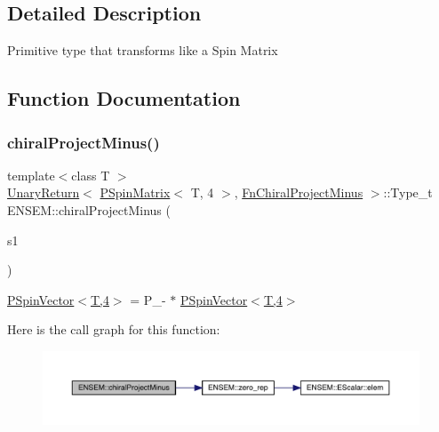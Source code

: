 \subsection{Detailed Description}
Primitive type that transforms like a Spin Matrix 

\subsection{Function Documentation}
\mbox{\label{group__primspinmatrix_ga6f9b4b2c70376b17548850f503a8c393}} 
\subsubsection{\texorpdfstring{chiralProjectMinus()}{chiralProjectMinus()}}
{\footnotesize\ttfamily template$<$class T $>$ \\
\mbox{\hyperlink{structENSEM_1_1UnaryReturn}{Unary\+Return}}$<$ \mbox{\hyperlink{classENSEM_1_1PSpinMatrix}{P\+Spin\+Matrix}}$<$ T, 4 $>$, \mbox{\hyperlink{structENSEM_1_1FnChiralProjectMinus}{Fn\+Chiral\+Project\+Minus}} $>$\+::Type\+\_\+t E\+N\+S\+E\+M\+::chiral\+Project\+Minus (\begin{DoxyParamCaption}\item[{const \mbox{\hyperlink{classENSEM_1_1PSpinMatrix}{P\+Spin\+Matrix}}$<$ T, 4 $>$ \&}]{s1 }\end{DoxyParamCaption})\hspace{0.3cm}{\ttfamily [inline]}}



\mbox{\hyperlink{classENSEM_1_1PSpinVector_3_01T_00_014_01_4}{P\+Spin\+Vector$<$\+T,4$>$}} = P\+\_\+-\/ $\ast$ \mbox{\hyperlink{classENSEM_1_1PSpinVector_3_01T_00_014_01_4}{P\+Spin\+Vector$<$\+T,4$>$}} 

Here is the call graph for this function\+:\nopagebreak
\begin{figure}[H]
\begin{center}
\leavevmode
\includegraphics[width=350pt]{d6/df5/group__primspinmatrix_ga6f9b4b2c70376b17548850f503a8c393_cgraph}
\end{center}
\end{figure}
\mbox{\label{group__primspinmatrix_ga6005e8f3442735f70e74a218c3d5a141}} 
